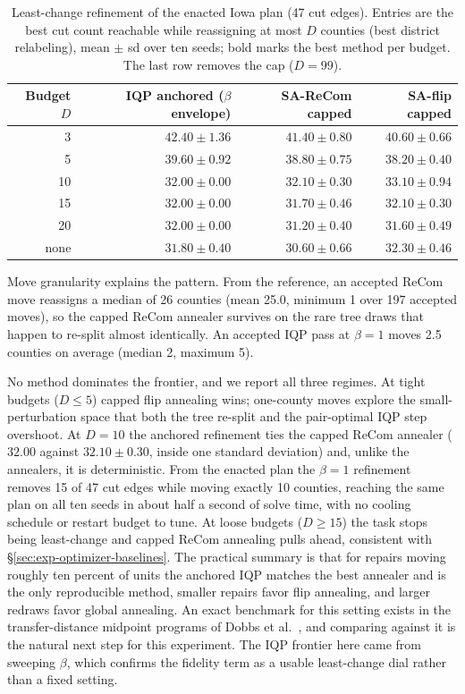 \documentclass[11pt]{article}
\begin{document}
\begin{table}[htbp]
\centering
\small
\begin{tabular}{rrrr}
\toprule
Budget $D$ & IQP anchored ($\beta$ envelope) & SA-ReCom capped & SA-flip capped \\
\midrule
3  & $42.40 \pm 1.36$ & $41.40 \pm 0.80$ & $\mathbf{40.60 \pm 0.66}$ \\
5  & $39.60 \pm 0.92$ & $38.80 \pm 0.75$ & $\mathbf{38.20 \pm 0.40}$ \\
10 & $\mathbf{32.00 \pm 0.00}$ & $32.10 \pm 0.30$ & $33.10 \pm 0.94$ \\
15 & $32.00 \pm 0.00$ & $\mathbf{31.70 \pm 0.46}$ & $32.10 \pm 0.30$ \\
20 & $32.00 \pm 0.00$ & $\mathbf{31.20 \pm 0.40}$ & $31.60 \pm 0.49$ \\
none & $31.80 \pm 0.40$ & $\mathbf{30.60 \pm 0.66}$ & $32.30 \pm 0.46$ \\
\bottomrule
\end{tabular}
\caption{Least-change refinement of the enacted Iowa plan (47 cut
  edges). Entries are the best cut count reachable while reassigning
  at most $D$ counties (best district relabeling), mean $\pm$ sd over
  ten seeds; bold marks the best method per budget. The last row
  removes the cap ($D = 99$).}\label{tab:least-change}
\end{table}

Move granularity explains the pattern. From the reference, an
accepted ReCom move reassigns a median of 26 counties (mean 25.0,
minimum 1 over 197 accepted moves), so the capped ReCom annealer
survives on the rare tree draws that happen to re-split almost
identically. An accepted IQP pass at $\beta = 1$ moves 2.5 counties
on average (median 2, maximum 5).

No method dominates the frontier, and we report all three regimes.
At tight budgets ($D \le 5$) capped flip annealing wins; one-county
moves explore the small-perturbation space that both the tree
re-split and the pair-optimal IQP step overshoot. At $D = 10$ the
anchored refinement ties the capped ReCom annealer ($32.00$ against
$32.10 \pm 0.30$, inside one standard deviation) and, unlike the
annealers, it is deterministic. From the enacted plan the $\beta = 1$ refinement
removes 15 of 47 cut edges while moving exactly 10 counties, reaching
the same plan on all ten seeds in about half a second of solve time,
with no cooling schedule or restart budget to tune. At loose budgets
($D \ge 15$) the task stops being least-change and capped ReCom
annealing pulls ahead, consistent with
\S\ref{sec:exp-optimizer-baselines}. The practical summary is that
for repairs moving roughly ten percent of units the anchored IQP
matches the best annealer and is the only reproducible method,
smaller repairs favor flip annealing, and larger redraws favor global
annealing. An exact benchmark for this setting exists in the
transfer-distance midpoint programs of Dobbs et
al.~\cite{dobbs2024facilitating}, and comparing against it is the
natural next step for this experiment. The IQP
frontier here came from sweeping $\beta$, which confirms the fidelity
term as a usable least-change dial rather than a fixed setting.
\end{document}
